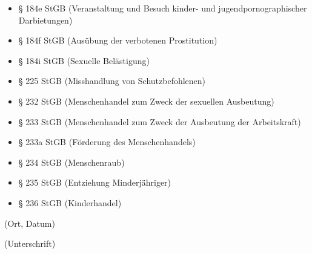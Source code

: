 \documentclass[11pt]{article}
\newcommand{\hint}[1]{{\footnotesize\color{gray}#1}}
\newlength{\tfl}%
\newcommand{\TextFieldFill}[2][]{%
    \setlength{\tfl}{\linewidth}%
    \settowidth{\dimen0}{#2}%
    \addtolength{\tfl}{-\dimen0}%
    \addtolength{\tfl}{-1em}%
    \TextField[#1, bordercolor={}, backgroundcolor={}, width=\tfl]{#2}%
}
\begin{document}
\begin{Form}
\begin{itemize}[itemsep=-0.1cm]
        \item § 184e StGB (Veranstaltung und Besuch kinder- und jugendpornographischer Darbietungen)
        \item § 184f StGB (Ausübung der verbotenen Prostitution)
        \item § 184i StGB (Sexuelle Belästigung)
        \item § 225 StGB (Misshandlung von Schutzbefohlenen)
        \item § 232 StGB (Menschenhandel zum Zweck der sexuellen Ausbeutung)
        \item § 233 StGB (Menschenhandel zum Zweck der Ausbeutung der Arbeitskraft)
        \item § 233a StGB (Förderung des Menschenhandels)
        \item § 234 StGB (Menschenraub)
        \item § 235 StGB (Entziehung Minderjähriger)
        \item § 236 StGB (Kinderhandel)
    \end{itemize}

    \vspace{1.5cm}

    \begin{minipage}{0.4\textwidth}
        \TextFieldFill[name=dateplace]{}
        \hint{(Ort, Datum)}
    \end{minipage}
    \begin{minipage}{0.6\textwidth}
        \vspace{1.2em}
        \hrulefill

        \hint{(Unterschrift)}
    \end{minipage}
    \end{Form}
\end{document}
